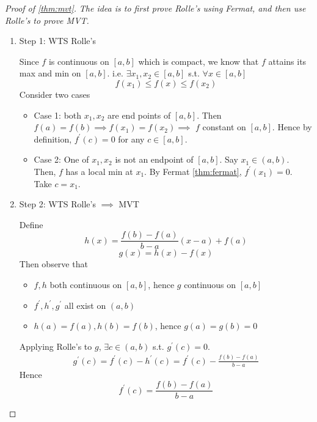 \begin{proof}[Proof of \ref{thm:mvt}] 
    \textit{
        The idea is to first prove Rolle's using Fermat,
        and then use
        Rolle's to prove MVT.
    }
    \begin{enumerate}
        \item Step 1: WTS Rolle's
        \medskip

        Since $f$ is continuous on $[a, b]$ which is compact,
        we know that $f$ attains its max and min on $[a,b]$.
        i.e. $\exists x_1, x_2 \in [a, b]$ s.t. $\forall x \in [a, b]$
        \[
            f(x_1) \leq f(x) \leq f(x_2)
        \]
        Consider two cases 
        \begin{itemize}
            \item Case 1: both $x_1, x_2$ are end points of $[a,b]$.
            Then $f(a) = f(b) \implies f(x_1) = f(x_2) \implies$
            $f$ constant on $[a,b]$. Hence by definition,
            $f^{\prime}(c) = 0$ for any $c \in [a, b]$.
            \item Case 2: One of $x_1, x_2$ is not an endpoint of $[a,b]$. 
            Say $x_1 \in (a, b)$. Then, 
            $f$ has a local min at $x_1$. 
            By Fermat \ref{thm:fermat},
            $f^{\prime}(x_1) = 0$. Take $c = x_1$.
        \end{itemize} 
        \item Step 2: WTS Rolle's $\implies$ MVT
        
        \medskip
        Define 
        \[
            h(x) = \frac{f(b) - f(a)}{b-a} (x-a) + f(a)
        \]
        \[
            g(x) = h(x) - f(x)
        \]
        Then observe that 
        \begin{itemize}
            \item $f, h$ both continuous on $[a, b]$, hence $g$ continuous on $[a,b]$
            \item $f^{\prime}, h^{\prime}, g^{\prime}$ all exist on $(a, b)$
            \item $h(a) = f(a),h(b) = f(b)$, hence $g(a) = g(b) = 0$
        \end{itemize} 
        Applying Rolle's to $g$, $\exists c\in (a, b)$ s.t. $g^{\prime}(c) = 0$.
        \begin{align*}
            g^{\prime}(c) = f^{\prime}(c) - h^{\prime}(c) 
            = f^{\prime}(c) - \frac{f(b) - f(a)}{b-a}
        \end{align*}
        Hence 
        \[
            f^{\prime}(c) = \frac{f(b) - f(a)}{b-a}
        \]
    \end{enumerate} 
\end{proof}

